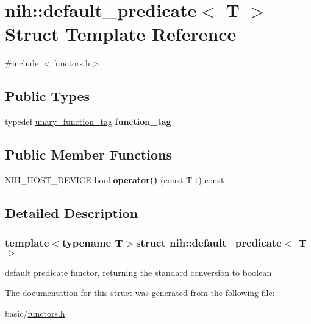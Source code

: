 \hypertarget{structnih_1_1default__predicate}{
\section{nih\-:\-:default\-\_\-predicate$<$ \-T $>$ \-Struct \-Template \-Reference}
\label{structnih_1_1default__predicate}
}


{\ttfamily \#include $<$functors.\-h$>$}

\subsection*{\-Public \-Types}
\begin{DoxyCompactItemize}
\item 
\hypertarget{structnih_1_1default__predicate_a3c78b6a78c286e17e67eff3392e965d2}{
typedef \hyperlink{structnih_1_1unary__function__tag}{unary\-\_\-function\-\_\-tag} {\bfseries function\-\_\-tag}}
\label{structnih_1_1default__predicate_a3c78b6a78c286e17e67eff3392e965d2}

\end{DoxyCompactItemize}
\subsection*{\-Public \-Member \-Functions}
\begin{DoxyCompactItemize}
\item 
\hypertarget{structnih_1_1default__predicate_aeac797a71589ecdaaf2e528f9f7c88a4}{
\-N\-I\-H\-\_\-\-H\-O\-S\-T\-\_\-\-D\-E\-V\-I\-C\-E bool {\bfseries operator()} (const \-T t) const }
\label{structnih_1_1default__predicate_aeac797a71589ecdaaf2e528f9f7c88a4}

\end{DoxyCompactItemize}


\subsection{\-Detailed \-Description}
\subsubsection*{template$<$typename T$>$struct nih\-::default\-\_\-predicate$<$ T $>$}

default predicate functor, returning the standard conversion to boolean 

\-The documentation for this struct was generated from the following file\-:\begin{DoxyCompactItemize}
\item 
basic/\hyperlink{functors_8h}{functors.\-h}\end{DoxyCompactItemize}
